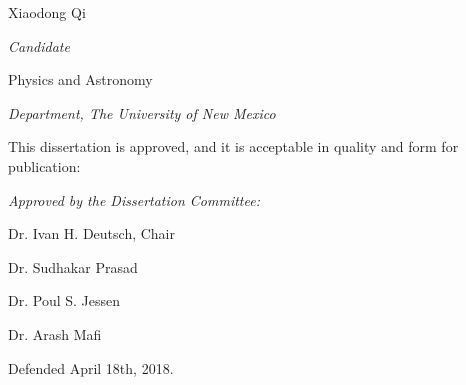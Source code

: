 \documentclass[letterpaper,10pt]{article}
\begin{document}
\vspace{0.5in}
\begin{Large}
 \noindent Xiaodong Qi 
 \vspace{-0.2in}
 \end{Large}

 \noindent\makebox[\linewidth][l]{\rule{2.8in}{1pt}}
  \textit{Candidate} \vspace{0.4in}
 
 \begin{Large}
 \noindent Physics and Astronomy
 \vspace{-0.2in}
 \end{Large}
 
  \noindent\makebox[\linewidth][l]{\rule{2.8in}{1pt}} 
    \textit{Department, The University of New Mexico} \vspace{0.2in}


 
 
   \noindent This dissertation is approved, and it is acceptable in quality and form for publication: \vspace{0.2in}
\begin{large}
 \noindent \textit{Approved by the Dissertation Committee:} \vspace{0.45in}
 \end{large}
 
%  
%  
%  

 

 \noindent\makebox[\linewidth]{\rule{5.5in}{1pt}}
 
  \hfill Dr. Ivan H. Deutsch, Chair \vspace{0.35in}
  
  

  \noindent\makebox[\linewidth]{\rule{5.5in}{1pt}}
   
   \hfill Dr. Sudhakar Prasad  \vspace{0.35in}
 
 
  \noindent\makebox[\linewidth]{\rule{5.5in}{1pt}}
  
    \hfill Dr. Poul S. Jessen  \vspace{0.35in}
 
 

  \noindent\makebox[\linewidth]{\rule{5.5in}{1pt}}
    
    \hfill Dr. Arash Mafi  \vspace{0.05in}
    
      
Defended April 18th, 2018.
 
\end{document}
